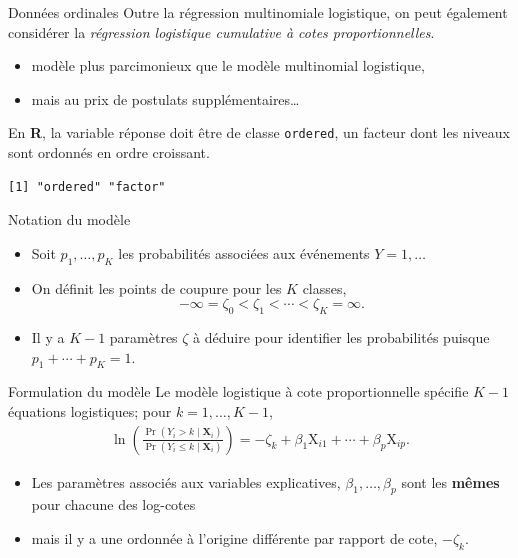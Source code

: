 \documentclass[
  ignorenonframetext,
]{beamer}
\newenvironment{Shaded}{\begin{snugshade}}{\end{snugshade}}
\newcommand{\FunctionTok}[1]{\textcolor[rgb]{0.28,0.35,0.67}{#1}}
\newcommand{\NormalTok}[1]{\textcolor[rgb]{0.00,0.23,0.31}{#1}}
\newcommand{\SpecialCharTok}[1]{\textcolor[rgb]{0.37,0.37,0.37}{#1}}
\providecommand{\tightlist}{%
  \setlength{\itemsep}{0pt}\setlength{\parskip}{0pt}}\usepackage{longtable,booktabs,array}
\begin{document}
\begin{frame}[fragile]{Données ordinales}
\protect\hypertarget{donnuxe9es-ordinales}{}
Outre la régression multinomiale logistique, on peut également
considérer la \emph{régression logistique cumulative à cotes
proportionnelles}.

\begin{itemize}
\tightlist
\item
  modèle plus parcimonieux que le modèle multinomial logistique,
\item
  mais au prix de postulats supplémentaires\ldots{}
\end{itemize}

En \textbf{R}, la variable réponse doit être de classe \texttt{ordered},
un facteur dont les niveaux sont ordonnés en ordre croissant.

\begin{Shaded}
\end{Shaded}

\begin{verbatim}
[1] "ordered" "factor" 
\end{verbatim}
\end{frame}

\begin{frame}{Notation du modèle}
\protect\hypertarget{notation-du-moduxe8le}{}
\begin{itemize}
\tightlist
\item
  Soit \(p_1, \ldots, p_K\) les probabilités associées aux événements
  \(Y=1, \ldots\)
\item
  On définit les points de coupure pour les \(K\) classes,
  \[ -\infty = \zeta_0 < \zeta_1 < \cdots < \zeta_K = \infty.\]
\item
  Il y a \(K-1\) paramètres \(\zeta\) à déduire pour identifier les
  probabilités puisque \(p_1 + \cdots + p_K=1\).
\end{itemize}
\end{frame}

\begin{frame}{Formulation du modèle}
\protect\hypertarget{formulation-du-moduxe8le}{}
Le modèle logistique à cote proportionnelle spécifie \(K-1\) équations
logistiques; pour \(k=1, \ldots, K-1\), \begin{align*}
\ln \left(\frac{\Pr(Y_i> k\mid \mathbf{X}_i)}{\Pr(Y_i \le k\mid \mathbf{X}_i)}\right) = -\zeta_k + \beta_1 \mathrm{X}_{i1} + \cdots + \beta_p \mathrm{X}_{ip}.
\end{align*}

\begin{itemize}
\tightlist
\item
  Les paramètres associés aux variables explicatives,
  \(\beta_1, \ldots, \beta_p\) sont les \textbf{mêmes} pour chacune des
  log-cotes
\item
  mais il y a une ordonnée à l'origine différente par rapport de cote,
  \(-\zeta_k\).
\end{itemize}
\end{frame}
\end{document}
